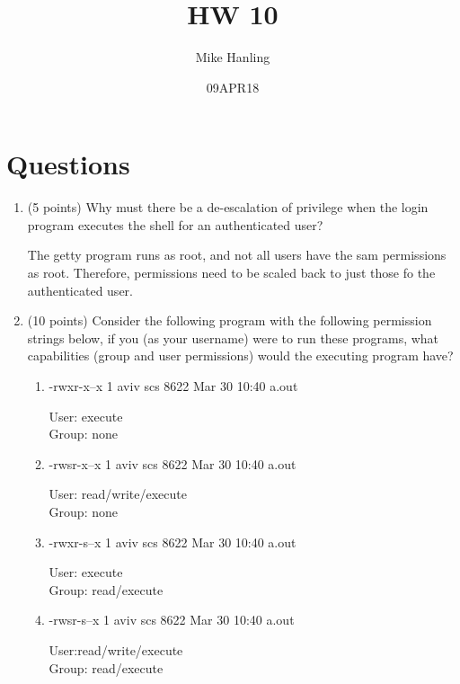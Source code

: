 \documentclass{article}[9pt]
\title{HW 10}
\author{Mike Hanling}
\date{09APR18}
\newenvironment{myanswer}{\begin{mdframed}\begin{answerfont}}{\end{answerfont}\end{mdframed}}
\begin{document}
\maketitle
\section*{Questions}
\label{sec:orgfce6862}
\begin{enumerate}


\item (5 points) Why must there be a de-escalation of privilege when the login
program executes the shell for an authenticated user?
\begin{myanswer}
The getty program runs as root, and not all users have the sam
permissions as root.  Therefore, permissions need to be scaled back to
just those fo the authenticated user.
\end{myanswer}

\item (10 points) Consider the following program with the following permission
strings below, if you (as your username) were to run these
programs, what capabilities (group and user permissions) would
the executing program have?

\begin{enumerate}
\item -rwxr-x--x 1 aviv scs 8622 Mar 30 10:40 a.out
\begin{myanswer}
User: execute\\
Group: none
\end{myanswer}

\item -rwsr-x--x 1 aviv scs 8622 Mar 30 10:40 a.out
\begin{myanswer}
User: read/write/execute\\
Group: none
\end{myanswer}

\item -rwxr-s--x 1 aviv scs 8622 Mar 30 10:40 a.out
\begin{myanswer}
User: execute\\
Group: read/execute
\end{myanswer}

\item -rwsr-s--x 1 aviv scs 8622 Mar 30 10:40 a.out
\begin{myanswer}
User:read/write/execute\\
Group: read/execute
\end{myanswer}


\end{enumerate}
\end{enumerate}
\end{document}
